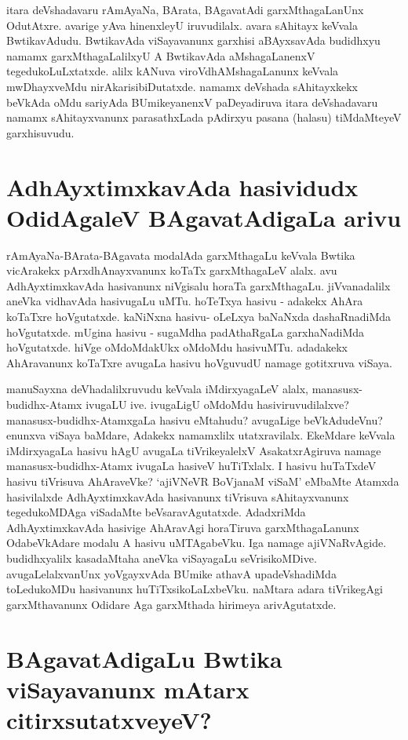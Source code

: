 itara deVshadavaru rAmAyaNa, BArata, BAgavatAdi garxMthagaLanUnx OdutAtxre. avarige yAva hinenxleyU iruvudilalx. avara sAhitayx keVvala BwtikavAdudu. BwtikavAda viSayavanunx garxhisi aBAyxsavAda budidhxyu namamx garxMthagaLalilxyU A BwtikavAda aMshagaLanenxV tegedukoLuLxtatxde. alilx kANuva viroVdhAMshagaLanunx keVvala mwDhayxveMdu nirAkarisibiDutatxde. namamx deVshada sAhitayxkekx beVkAda oMdu sariyAda BUmikeyanenxV paDeyadiruva itara deVshadavaru namamx sAhitayxvanunx parasathxLada pAdirxyu pasana (halasu) tiMdaMteyeV garxhisuvudu.

\section*{AdhAyxtimxkavAda hasividudx OdidAgaleV BAgavatAdigaLa arivu}

rAmAyaNa-BArata-BAgavata modalAda garxMthagaLu keVvala Bwtika vicArakekx pArxdhAnayxvanunx koTaTx garxMthagaLeV alalx. avu AdhAyxtimxkavAda hasivanunx niVgisalu horaTa garxMthagaLu. jiVvanadalilx aneVka vidhavAda hasivugaLu uMTu. hoTeTxya hasivu - adakekx AhAra koTaTxre hoVgutatxde. kaNiNxna hasivu- oLeLxya baNaNxda dashaRnadiMda hoVgutatxde. mUgina hasivu - sugaMdha padAthaRgaLa garxhaNadiMda hoVgutatxde. hiVge oMdoMdakUkx oMdoMdu hasivuMTu. adadakekx AhAravanunx koTaTxre avugaLa hasivu hoVguvudU namage gotitxruva viSaya. 

manuSayxna deVhadalilxruvudu keVvala iMdirxyagaLeV alalx, manasusx-budidhx-Atamx ivugaLU ive. ivugaLigU oMdoMdu hasiviruvudilalxve? manasusx-budidhx-AtamxgaLa hasivu eMtahudu? avugaLige beVkAdudeVnu? enunxva viSaya baMdare, Adakekx  namamxlilx utatxravilalx. EkeMdare keVvala iMdirxyagaLa hasivu hAgU avugaLa tiVrikeyalelxV AsakatxrAgiruva namage manasusx-budidhx-Atamx ivugaLa hasiveV huTiTxlalx. I hasivu huTaTxdeV hasivu tiVrisuva AhAraveVke? `ajiVNeVR BoVjanaM viSaM'\label{265} eMbaMte Atamxda hasivilalxde AdhAyxtimxkavAda hasivanunx tiVrisuva sAhitayxvanunx tegedukoMDAga viSadaMte beVsaravAgutatxde. AdadxriMda AdhAyxtimxkavAda hasivige AhAravAgi horaTiruva garxMthagaLanunx OdabeVkAdare modalu A hasivu uMTAgabeVku. Iga namage ajiVNaRvAgide. budidhxyalilx kasadaMtaha aneVka viSayagaLu seVrisikoMDive. avugaLelalxvanUnx yoVgayxvAda BUmike athavA upadeVshadiMda toLedukoMDu hasivanunx huTiTxsikoLaLxbeVku. naMtara adara tiVrikegAgi garxMthavanunx Odidare Aga garxMthada hirimeya arivAgutatxde.

\section*{BAgavatAdigaLu Bwtika viSayavanunx mAtarx citirxsutatxveyeV?}


